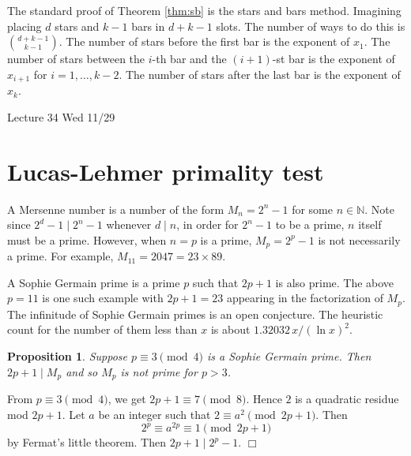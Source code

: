 \documentclass{article}
\def\N{{\mathbb N}}
\newtheorem{proposition}[subsection]{Proposition}
\newenvironment{proof}{\noindent {\bf Proof:}}{$\Box$ \vspace{2 ex}}
\newcommand{\add}[1]{{\color{blue} #1}}
\begin{document}
\vspace{5pt}
The standard proof of Theorem \ref{thm:sb} is the stars and bars method. Imagining placing $d$ stars and $k-1$ bars in $d + k - 1$ slots. The number of ways to do this is $\binom{d+k-1}{k-1}$. The number of stars before the first bar is the exponent of $x_1$. The number of stars between the $i$-th bar and the $(i+1)$-st bar is the exponent of $x_{i+1}$ for $i=1,\ldots,k-2$. The number of stars after the last bar is the exponent of $x_k$.


\begin{center}
    \add{Lecture 34 Wed 11/29}
\end{center}

\section{Lucas-Lehmer primality test}
A Mersenne number is a number of the form $M_n = 2^n - 1$ for some $n\in\N$. Note since $2^d - 1\mid 2^n - 1$ whenever $d\mid n$, in order for $2^n - 1$ to be a prime, $n$ itself must be a prime. However,  when $n=p$ is a prime, $M_p = 2^p - 1$ is not necessarily a prime. For example, $M_{11} = 2047 = 23\times 89$.

A Sophie Germain prime is a prime $p$ such that $2p + 1$ is also prime. The above $p = 11$ is one such example with $2p+1 = 23$ appearing in the factorization of $M_p$. The infinitude of Sophie Germain primes is an open conjecture. The heuristic count for the number of them less than $x$ is about $1.32032\,x/(\ln x)^2.$

\begin{proposition}
    Suppose $p\equiv 3\pmod{4}$ is a Sophie Germain prime. Then $2p+1\mid M_p$ and so $M_p$ is not prime for $p > 3$.
\end{proposition}

\begin{proof}
    From $p\equiv 3\pmod{4}$, we get $2p+1\equiv 7\pmod{8}$. Hence $2$ is a quadratic residue mod $2p+1$. Let $a$ be an integer such that $2\equiv a^2\pmod{2p+1}.$ Then
    $$2^p \equiv a^{2p} \equiv 1\pmod{2p+1}$$
    by Fermat's little theorem. Then $2p+1\mid 2^p - 1$.
\end{proof}
\end{document}

